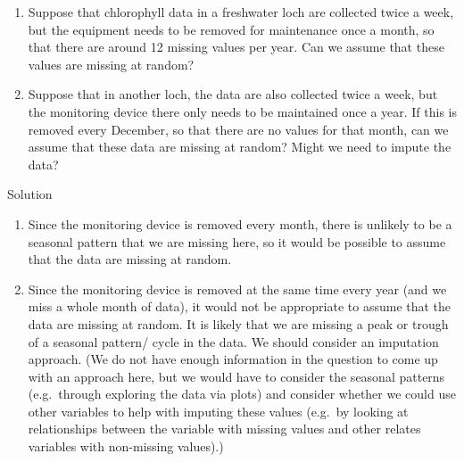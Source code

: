 \documentclass[
  letterpaper,
  DIV=11,
  numbers=noendperiod,
  oneside]{scrartcl}
\begin{document}
\begin{tcolorbox}[enhanced jigsaw, bottomrule=.15mm, breakable, bottomtitle=1mm, colback=white, titlerule=0mm, colbacktitle=quarto-callout-tip-color!10!white, rightrule=.15mm, toptitle=1mm, left=2mm, opacityback=0, toprule=.15mm, arc=.35mm, title={Task 6}, colframe=quarto-callout-tip-color-frame, coltitle=black, leftrule=.75mm, opacitybacktitle=0.6]

\begin{enumerate}
\def\labelenumi{(\alph{enumi})}
\item
  Suppose that chlorophyll data in a freshwater loch are collected twice
  a week, but the equipment needs to be removed for maintenance once a
  month, so that there are around 12 missing values per year. Can we
  assume that these values are missing at random?
\item
  Suppose that in another loch, the data are also collected twice a
  week, but the monitoring device there only needs to be maintained once
  a year. If this is removed every December, so that there are no values
  for that month, can we assume that these data are missing at random?
  Might we need to impute the data?
\end{enumerate}

Solution

\begin{enumerate}
\def\labelenumi{(\alph{enumi})}
\item
  Since the monitoring device is removed every month, there is unlikely
  to be a seasonal pattern that we are missing here, so it would be
  possible to assume that the data are missing at random.
\item
  Since the monitoring device is removed at the same time every year
  (and we miss a whole month of data), it would not be appropriate to
  assume that the data are missing at random. It is likely that we are
  missing a peak or trough of a seasonal pattern/ cycle in the data. We
  should consider an imputation approach. (We do not have enough
  information in the question to come up with an approach here, but we
  would have to consider the seasonal patterns (e.g.~through exploring
  the data via plots) and consider whether we could use other variables
  to help with imputing these values (e.g.~by looking at relationships
  between the variable with missing values and other relates variables
  with non-missing values).)
\end{enumerate}

\end{tcolorbox}
\end{document}
